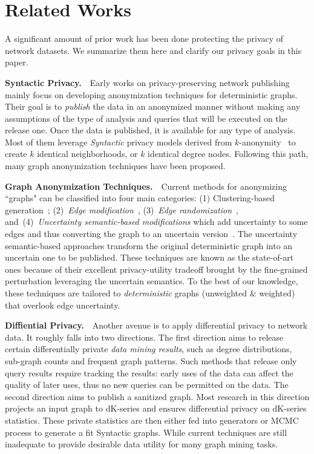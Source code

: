 \section{Related Works}
A significant amount of prior work has been done protecting the privacy of network datasets.
We summarize them here and clarify our privacy goals in this paper. 

\textbf{Syntactic Privacy.}~~Early works on privacy-preserving network publishing mainly focus on developing anonymization techniques for deterministic graphs. Their goal is to \emph{publish} the data in an anonymized manner without making any assumptions of the type of analysis and queries that will be executed on the release one. Once the data is published, it is available for any type of analysis. Most of them leverage \emph{Syntactic} privacy models derived from $k$-anonymity~\cite{Sweeney:2002:KAM:774544.774552} to create $k$ identical neighborhoods, or $k$ identical degree nodes. Following this path, many graph anonymization techniques have been proposed.

\textbf{Graph Anonymization Techniques.}~~Current methods for anonymizing ``graphs" can be classified into four main categories: (1) Clustering-based generation~\cite{Hay_Anonymizing_2007,Bhagat_Class_2009,hay2010resisting}; (2)~{\em Edge modification}~\cite{Liu_Towards_2008, Zhou_Preserving_2008, Wang2011, Wu_k_2010, Skarkala_Privacy_2012}, 
(3)~{\em Edge randomization}~\cite{Liu_Privacy_2009,Ying_Randomizing_2008, Ninggal_Utility_2015},
and~(4)~{\em Uncertainty semantic-based modifications} which add uncertainty to some edges and thus converting the graph to an uncertain version~\cite{Boldi_Injecting_2012, Nguyen_Anonymizing_2015}. The uncertainty semantic-based approaches transform the original deterministic graph into an uncertain one to be published. These techniques are known as the state-of-art ones because of their excellent privacy-utility tradeoff brought by the fine-grained perturbation leveraging the uncertain semantics. To the best of our knowledge, these techniques are tailored to \emph{deterministic} graphs (unweighted \& weighted) that overlook edge uncertainty.  

\textbf{Diffiential Privacy.}~~Another avenue is to apply differential privacy to network data. It roughly falls into two directions. The first direction aims to release certain differentially private \emph{data mining results}, such as degree distributions, sub-graph counts and frequent graph patterns. Such methods that release only query results require tracking the results: early uses of the data can affect the quality of later uses, thus no new queries can be permitted on the data.  
The second direction aims to publish a sanitized graph. Most research in this direction projects an input graph to dK-series and ensures differential privacy on dK-series statistics. These private statistics are then either fed into generators or MCMC process to generate a fit Syntactic graphs. While current techniques are still inadequate to provide desirable data utility for many graph mining tasks. 

